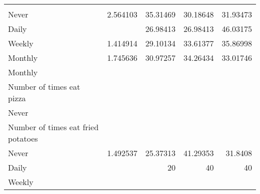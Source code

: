 \documentclass{article}
\begin{document}
\begin{tabular}{lllll}
  \multicolumn{1}{|r}{} &
  \multicolumn{1}{r}{} &
  \multicolumn{1}{r}{} &
  \multicolumn{1}{r}{} \\
\multicolumn{1}{l}{\hspace{5em}Never} &
  \multicolumn{1}{|r}{2.564103} &
  \multicolumn{1}{r}{35.31469} &
  \multicolumn{1}{r}{30.18648} &
  \multicolumn{1}{r}{31.93473} \\
\multicolumn{1}{l}{\hspace{5em}Daily} &
  \multicolumn{1}{|r}{} &
  \multicolumn{1}{r}{26.98413} &
  \multicolumn{1}{r}{26.98413} &
  \multicolumn{1}{r}{46.03175} \\
\multicolumn{1}{l}{\hspace{5em}Weekly} &
  \multicolumn{1}{|r}{1.414914} &
  \multicolumn{1}{r}{29.10134} &
  \multicolumn{1}{r}{33.61377} &
  \multicolumn{1}{r}{35.86998} \\
\multicolumn{1}{l}{\hspace{5em}Monthly} &
  \multicolumn{1}{|r}{1.745636} &
  \multicolumn{1}{r}{30.97257} &
  \multicolumn{1}{r}{34.26434} &
  \multicolumn{1}{r}{33.01746} \\
\multicolumn{1}{l}{\hspace{1em}Monthly} &
  \multicolumn{1}{|r}{} &
  \multicolumn{1}{r}{} &
  \multicolumn{1}{r}{} &
  \multicolumn{1}{r}{} \\
\multicolumn{1}{l}{\hspace{2em}Number of times eat pizza} &
  \multicolumn{1}{|r}{} &
  \multicolumn{1}{r}{} &
  \multicolumn{1}{r}{} &
  \multicolumn{1}{r}{} \\
\multicolumn{1}{l}{\hspace{3em}Never} &
  \multicolumn{1}{|r}{} &
  \multicolumn{1}{r}{} &
  \multicolumn{1}{r}{} &
  \multicolumn{1}{r}{} \\
\multicolumn{1}{l}{\hspace{4em}Number of times eat fried potatoes} &
  \multicolumn{1}{|r}{} &
  \multicolumn{1}{r}{} &
  \multicolumn{1}{r}{} &
  \multicolumn{1}{r}{} \\
\multicolumn{1}{l}{\hspace{5em}Never} &
  \multicolumn{1}{|r}{1.492537} &
  \multicolumn{1}{r}{25.37313} &
  \multicolumn{1}{r}{41.29353} &
  \multicolumn{1}{r}{31.8408} \\
\multicolumn{1}{l}{\hspace{5em}Daily} &
  \multicolumn{1}{|r}{} &
  \multicolumn{1}{r}{20} &
  \multicolumn{1}{r}{40} &
  \multicolumn{1}{r}{40} \\
\multicolumn{1}{l}{\hspace{5em}Weekly} &

\end{tabular}
\end{document}
